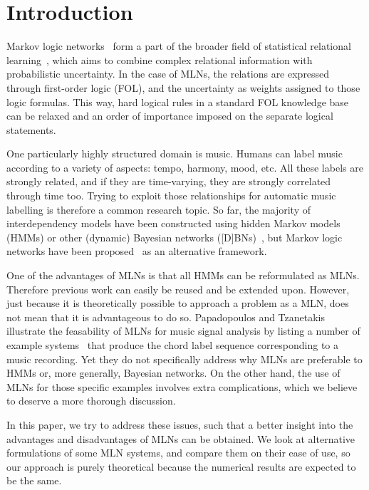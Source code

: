 \documentclass[letterpaper]{article} %
\begin{document}
\section{Introduction}
Markov logic networks~\cite{richardson2006ml} form a part of the broader field of statistical relational learning~\cite{getoor2007itsrl}, which aims to combine complex relational information with probabilistic uncertainty. In the case of MLNs, the relations are expressed through first-order logic (FOL), and the uncertainty as weights assigned to those logic formulas. This way, hard logical rules in a standard FOL knowledge base can be relaxed and an order of importance imposed on the separate logical statements.

One particularly highly structured domain is music. Humans can label music according to a variety of aspects: tempo, harmony, mood, etc. All these labels are strongly related, and if they are time-varying, they are strongly correlated through time too. Trying to exploit those relationships for automatic music labelling is therefore a common research topic. So far, the majority of interdependency models have been constructed using hidden Markov models (HMMs) or other (dynamic) Bayesian networks ([D]BNs)~\cite{mauch2010taslp,pauwels2013ismir,pauwels2014jnmr}, but Markov logic networks have been proposed~\cite{papadopoulos2012ismir,papadopoulos2013icassp,papadopoulos2017taslp} as an alternative framework.

One of the advantages of MLNs is that all HMMs can be reformulated as MLNs. Therefore previous work can easily be reused and be extended upon. However, just because it is theoretically possible to approach a problem as a MLN, does not mean that it is advantageous to do so. Papadopoulos and Tzanetakis illustrate the feasability of MLNs for music signal analysis by listing a number of example systems~\cite{papadopoulos2012ismir,papadopoulos2013icassp,papadopoulos2017taslp} that produce the chord label sequence corresponding to a music recording. Yet they do not specifically address why MLNs are preferable to HMMs or, more generally, Bayesian networks. On the other hand, the use of MLNs for those specific examples involves extra complications, which we believe to deserve a more thorough discussion.

In this paper, we try to address these issues, such that a better insight into the advantages and disadvantages of MLNs can be obtained. We look at alternative formulations of some MLN systems, and compare them on their ease of use, so our approach is purely theoretical because the numerical results are expected to be the same.
\end{document}
